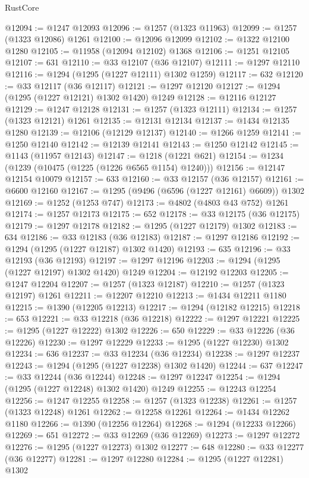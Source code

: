 \begin{lexlean}{RustCore}
\begin{coremodule}
@12094 := @1247 @12093
@12096 := @1257 (@1323 @11963)
@12099 := @1257 (@1323 @12086) @1261
@12100 := @12096 @12099
@12102 := @1322 @12100 @1280
@12105 := @11958 (@12094 @12102) @1368
@12106 := @1251 @12105
@12107 := 631
@12110 := @33 @12107 (@36 @12107)
@12111 := @1297 @12110
@12116 := @1294 (@1295 (@1227 @12111) @1302 @1259)
@12117 := 632
@12120 := @33 @12117 (@36 @12117)
@12121 := @1297 @12120
@12127 := @1294 (@1295 (@1227 @12121) @1302 @1420) @1249
@12128 := @12116 @12127
@12129 := @1247 @12128
@12131 := @1257 (@1323 @12111)
@12134 := @1257 (@1323 @12121) @1261
@12135 := @12131 @12134
@12137 := @1434 @12135 @1280
@12139 := @12106 (@12129 @12137)
@12140 := @1266 @1259
@12141 := @1250 @12140
@12142 := @12139 @12141
@12143 := @1250 @12142
@12145 := @1143 (@11957 @12143)
@12147 := @1218 (@1221 @621)
@12154 := @1234 (@1239 (@10475 (@1225 (@1226 @6565 @1154) @1240)))
@12156 := @12147 @12154 @10079
@12157 := 633
@12160 := @33 @12157 (@36 @12157)
@12161 := @6600 @12160
@12167 := @1295 (@9496 (@6596 (@1227 @12161) @6609)) @1302
@12169 := @1252 (@1253 @747)
@12173 := @4802 (@4803 @43 @752) @1261
@12174 := @1257 @12173
@12175 := 652
@12178 := @33 @12175 (@36 @12175)
@12179 := @1297 @12178
@12182 := @1295 (@1227 @12179) @1302
@12183 := 634
@12186 := @33 @12183 (@36 @12183)
@12187 := @1297 @12186
@12192 := @1294 (@1295 (@1227 @12187) @1302 @1420)
@12193 := 635
@12196 := @33 @12193 (@36 @12193)
@12197 := @1297 @12196
@12203 := @1294 (@1295 (@1227 @12197) @1302 @1420) @1249
@12204 := @12192 @12203
@12205 := @1247 @12204
@12207 := @1257 (@1323 @12187)
@12210 := @1257 (@1323 @12197) @1261
@12211 := @12207 @12210
@12213 := @1434 @12211 @1180
@12215 := @1390 (@12205 @12213)
@12217 := @1294 (@12182 @12215)
@12218 := 653
@12221 := @33 @12218 (@36 @12218)
@12222 := @1297 @12221
@12225 := @1295 (@1227 @12222) @1302
@12226 := 650
@12229 := @33 @12226 (@36 @12226)
@12230 := @1297 @12229
@12233 := @1295 (@1227 @12230) @1302
@12234 := 636
@12237 := @33 @12234 (@36 @12234)
@12238 := @1297 @12237
@12243 := @1294 (@1295 (@1227 @12238) @1302 @1420)
@12244 := 637
@12247 := @33 @12244 (@36 @12244)
@12248 := @1297 @12247
@12254 := @1294 (@1295 (@1227 @12248) @1302 @1420) @1249
@12255 := @12243 @12254
@12256 := @1247 @12255
@12258 := @1257 (@1323 @12238)
@12261 := @1257 (@1323 @12248) @1261
@12262 := @12258 @12261
@12264 := @1434 @12262 @1180
@12266 := @1390 (@12256 @12264)
@12268 := @1294 (@12233 @12266)
@12269 := 651
@12272 := @33 @12269 (@36 @12269)
@12273 := @1297 @12272
@12276 := @1295 (@1227 @12273) @1302
@12277 := 648
@12280 := @33 @12277 (@36 @12277)
@12281 := @1297 @12280
@12284 := @1295 (@1227 @12281) @1302

\end{coremodule}
\end{lexlean}
